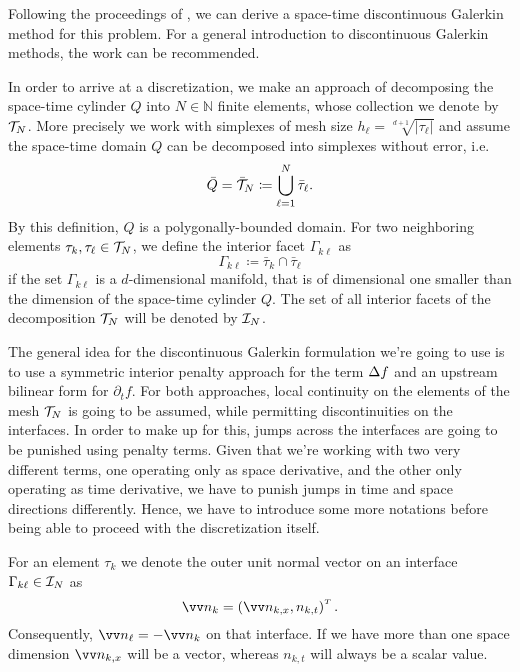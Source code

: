 \documentclass[../thesis.tex]{subfiles}
\begin{document}
Following the proceedings of \cite[Chapter 2]{Neumueller}, we can derive a space-time discontinuous Galerkin method for this problem.
For a general introduction to discontinuous Galerkin methods, the work \cite{Cockburn} can be recommended.

In order to arrive at a discretization, we make an approach of decomposing the space-time cylinder $Q$ into $N \in \mathbb{N}$ finite elements, whose collection we denote by $\mathcal{T}_N$. More precisely we work with simplexes of mesh size $h_\ell = \sqrt[d+1]{|\tau_\ell|}$ and assume the space-time domain $Q$ can be decomposed into simplexes without error, i.e.
\[
	\bar{Q} = \bar{\mathcal{T}}_N \coloneqq \bigcup_{\ell=1}^N \bar{\tau}_\ell.
\]
By this definition, $Q$ is a polygonally-bounded domain.
For two neighboring elements $\tau_k, \tau_\ell \in \mathcal{T}_N$, we define the interior facet $\Gamma_{k \ell}$ as
\[
	\Gamma_{k \ell} \coloneqq \bar{\tau}_k \cap \bar{\tau}_\ell
\]
if the set $\Gamma_{k \ell}$ is a $d$-dimensional manifold, that is of dimensional one smaller than the dimension of the space-time cylinder $Q$. The set of all interior facets of the decomposition $\mathcal{T}_N$ will be denoted by $\mathcal{I}_N$.

The general idea for the discontinuous Galerkin formulation we're going to use is to use a symmetric interior penalty approach for the term $\Delta f$ and an upstream bilinear form for $\partial_t f$.
For both approaches, local continuity on the elements of the mesh $\mathcal{T}_N$ is going to be assumed, while permitting discontinuities on the interfaces. In order to make up for this, jumps across the interfaces are going to be punished using penalty terms.
Given that we're working with two very different terms, one operating only as space derivative, and the other only operating as time derivative, we have to punish jumps in time and space directions differently.
Hence, we have to introduce some more notations before being able to proceed with the discretization itself.

For an element $\tau_k$ we denote the outer unit normal vector on an interface $\Gamma_{k \ell} \in \mathcal{I}_N$ as
\[
	\markvec{n_k} = \left( \markvec{n_{k, x}}, n_{k, t} \right)^\tp.
\]
Consequently, $\markvec{n_\ell} = - \markvec{n_k}$ on that interface.
If we have more than one space dimension $\markvec{n_{k, x}}$ will be a vector, whereas $n_{k, t}$ will always be a scalar value.
\end{document}
